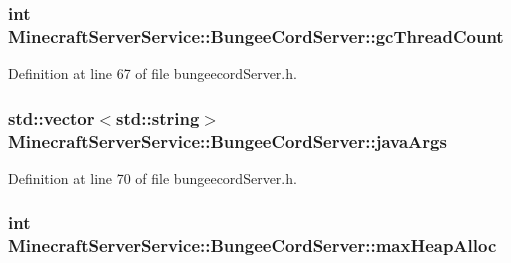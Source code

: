 \subsubsection[{\texorpdfstring{gc\+Thread\+Count}{gcThreadCount}}]{\setlength{\rightskip}{0pt plus 5cm}int Minecraft\+Server\+Service\+::\+Bungee\+Cord\+Server\+::gc\+Thread\+Count\hspace{0.3cm}{\ttfamily [protected]}}\hypertarget{class_minecraft_server_service_1_1_bungee_cord_server_a993736356331c55b759b8af235c547de}{}\label{class_minecraft_server_service_1_1_bungee_cord_server_a993736356331c55b759b8af235c547de}


Definition at line 67 of file bungeecord\+Server.\+h.

\subsubsection[{\texorpdfstring{java\+Args}{javaArgs}}]{\setlength{\rightskip}{0pt plus 5cm}std\+::vector$<$std\+::string$>$ Minecraft\+Server\+Service\+::\+Bungee\+Cord\+Server\+::java\+Args\hspace{0.3cm}{\ttfamily [protected]}}\hypertarget{class_minecraft_server_service_1_1_bungee_cord_server_a23dbf0f91c62b61730c643f93f9e1927}{}\label{class_minecraft_server_service_1_1_bungee_cord_server_a23dbf0f91c62b61730c643f93f9e1927}


Definition at line 70 of file bungeecord\+Server.\+h.

\subsubsection[{\texorpdfstring{max\+Heap\+Alloc}{maxHeapAlloc}}]{\setlength{\rightskip}{0pt plus 5cm}int Minecraft\+Server\+Service\+::\+Bungee\+Cord\+Server\+::max\+Heap\+Alloc\hspace{0.3cm}{\ttfamily [protected]}}\hypertarget{class_minecraft_server_service_1_1_bungee_cord_server_acefb624eabfc4d7516329e28ccb2acde}{}\label{class_minecraft_server_service_1_1_bungee_cord_server_acefb624eabfc4d7516329e28ccb2acde}


